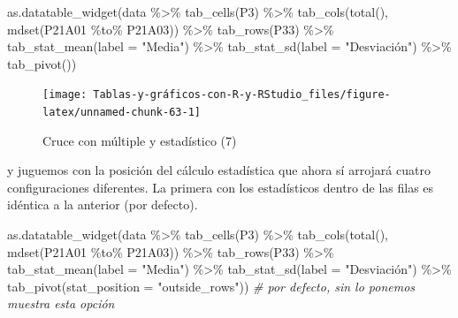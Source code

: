 \documentclass[
]{book}
\newenvironment{Shaded}{\begin{snugshade}}{\end{snugshade}}
\newcommand{\AttributeTok}[1]{\textcolor[rgb]{0.77,0.63,0.00}{#1}}
\newcommand{\CommentTok}[1]{\textcolor[rgb]{0.56,0.35,0.01}{\textit{#1}}}
\newcommand{\FunctionTok}[1]{\textcolor[rgb]{0.00,0.00,0.00}{#1}}
\newcommand{\NormalTok}[1]{#1}
\newcommand{\SpecialCharTok}[1]{\textcolor[rgb]{0.00,0.00,0.00}{#1}}
\newcommand{\StringTok}[1]{\textcolor[rgb]{0.31,0.60,0.02}{#1}}
\begin{document}
\begin{Shaded}
\begin{Highlighting}[]
\FunctionTok{as.datatable\_widget}\NormalTok{(data }\SpecialCharTok{\%\textgreater{}\%} \FunctionTok{tab\_cells}\NormalTok{(P3) }\SpecialCharTok{\%\textgreater{}\%} \FunctionTok{tab\_cols}\NormalTok{(}\FunctionTok{total}\NormalTok{(), }
  \FunctionTok{mdset}\NormalTok{(P21A01 }\SpecialCharTok{\%to\%}\NormalTok{ P21A03)) }\SpecialCharTok{\%\textgreater{}\%} \FunctionTok{tab\_rows}\NormalTok{(P33) }\SpecialCharTok{\%\textgreater{}\%} \FunctionTok{tab\_stat\_mean}\NormalTok{(}\AttributeTok{label =} \StringTok{"Media"}\NormalTok{) }\SpecialCharTok{\%\textgreater{}\%} 
  \FunctionTok{tab\_stat\_sd}\NormalTok{(}\AttributeTok{label =} \StringTok{"Desviación"}\NormalTok{) }\SpecialCharTok{\%\textgreater{}\%} \FunctionTok{tab\_pivot}\NormalTok{())}
\end{Highlighting}
\end{Shaded}

\begin{figure}[H]

{\centering \texttt{[image: Tablas-y-gráficos-con-R-y-RStudio\_files/figure-latex/unnamed-chunk-63-1]} 

}

\caption{Cruce con múltiple y estadístico (7)}\label{fig:unnamed-chunk-63}
\end{figure}

y juguemos con la posición del cálculo estadística que ahora sí arrojará cuatro configuraciones diferentes. La primera con los estadísticos dentro de las filas es idéntica a la anterior (por defecto).

\begin{Shaded}
\begin{Highlighting}[]
\FunctionTok{as.datatable\_widget}\NormalTok{(data }\SpecialCharTok{\%\textgreater{}\%} \FunctionTok{tab\_cells}\NormalTok{(P3) }\SpecialCharTok{\%\textgreater{}\%} \FunctionTok{tab\_cols}\NormalTok{(}\FunctionTok{total}\NormalTok{(), }
  \FunctionTok{mdset}\NormalTok{(P21A01 }\SpecialCharTok{\%to\%}\NormalTok{ P21A03)) }\SpecialCharTok{\%\textgreater{}\%} \FunctionTok{tab\_rows}\NormalTok{(P33) }\SpecialCharTok{\%\textgreater{}\%} \FunctionTok{tab\_stat\_mean}\NormalTok{(}\AttributeTok{label =} \StringTok{"Media"}\NormalTok{) }\SpecialCharTok{\%\textgreater{}\%} 
  \FunctionTok{tab\_stat\_sd}\NormalTok{(}\AttributeTok{label =} \StringTok{"Desviación"}\NormalTok{) }\SpecialCharTok{\%\textgreater{}\%} \FunctionTok{tab\_pivot}\NormalTok{(}\AttributeTok{stat\_position =} \StringTok{"outside\_rows"}\NormalTok{))  }\CommentTok{\# por defecto, sin lo ponemos muestra esta opción}
\end{Highlighting}
\end{Shaded}
\end{document}
